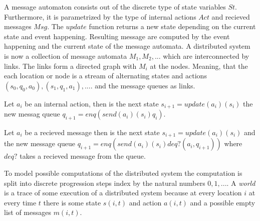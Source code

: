 A message automaton consists out of the discrete type of state variables
$St$. Furthermore, it is parametrized by the type of internal actions $Act$ 
and recieved messages $Msg$. The $update$ function returns a new state
depending on the current state and event happening. Resulting message are
computed by the event happening and the current state of the message automata.
A distributed system is now a collection of message automata $M_1,M_2,...$ which
are interconnected by links. The links form a directed graph with $M_i$ at the
nodes. Meaning, that the each location or node is a stream of alternating states
and actions $(s_0,q_0,a_0),(s_1,q_1,a_1),....$ and the message queues as links.~\cite{bickford2003logic}

\begin{defi}
  Let $a_i$ be an internal action, then is the next state
  $s_{i+1}=update(a_i)(s_i)$ the new messag queue $q_{i+1}=enq(send(a_i)(s_i)q_i)$.
\end{defi}

\begin{defi}
  Let $a_i$ be a recieved message then is the next state
  $s_{i+1}=update(a_i)(s_i)$ and the new message queue
  $q_{i+1}=enq(send(a_i)(s_i)deq?(a_i,q_{i+1}))$ where $deq?$ takes
  a recieved message from the queue. 
\end{defi}

To model possible computations of the distributed system the computation
is split into discrete progression steps index by the natural numbers $0,1,...$.
A \textit{world} is a trace of some execution of a distributed system because
at every location $i$ at every time $t$ there is some state $s(i,t)$ and action
$a(i,t)$ and a possible empty list of messages $m(i,t)$.


